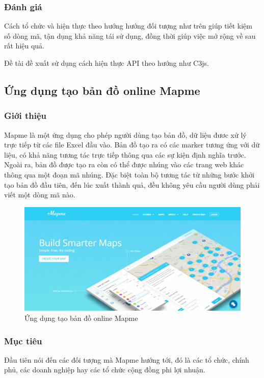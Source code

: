 \documentclass[12pt,a4paper,oneside]{article}
\begin{document}
\subsubsection{Đánh giá}
Cách tổ chức và hiện thực theo hướng hướng đối tượng như trên giúp tiết kiệm số dòng mã, tận dụng khả năng tái sử dụng, đồng thời giúp việc mở rộng về sau rất hiệu quả.

Đề tài đề xuất sử dụng cách hiện thực API theo hướng như C3js.

\subsection{Ứng dụng tạo bản đồ online Mapme}
\subsubsection{Giới thiệu}
Mapme\cite{mapme} là một ứng dụng cho phép người dùng tạo bản đồ, dữ liệu đươc xử lý trực tiếp từ các file Excel đầu vào. Bản đồ tạo ra có các marker tương ứng với dữ liệu, có khả năng tương tác trực tiếp thông qua các sự kiện định nghĩa trước. Ngoài ra, bản đồ được tạo ra còn có thể được nhúng vào các trang web khác thông qua một đoạn mã nhúng. Đặc biệt toàn bộ tương tác từ những bước khởi tạo bản đồ đầu tiên, đến lúc xuất thành quả, đều không yêu cầu người dùng phải viết một dòng mã nào.

\begin{figure}[htp]
	\begin{center}
    \includegraphics[scale=.4]{image/mapme}
    \caption{Ứng dụng tạo bản đồ online Mapme}
    \label{refhinh10}
    \end{center}
\end{figure}

\subsubsection{Mục tiêu}
Đầu tiên nói đến các đối tượng mà Mapme hướng tới, đó là các tổ chức, chính phủ, các doanh nghiệp hay các tổ chức cộng đồng phi lợi nhuận.
\end{document}
